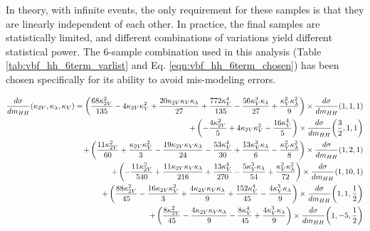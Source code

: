     In theory, with infinite events, the only requirement for these samples is that they are linearly independent of each other.
    In practice, the final samples are statistically limited, and different combinations of variations yield different statistical power.
    The 6-sample combination used in this analysis (Table \ref{tab:vbf_hh_6term_varlist} and Eq. \ref{eqn:vbf_hh_6term_chosen}) has been chosen specifically for its ability to avoid mis-modeling errors.

    {\footnotesize \begin{equation}
    \label{eqn:vbf_hh_6term_chosen}
    \begin{split}
        \frac{d\sigma}{dm_{HH}}(\kappa_{2V}, \kappa_{\lambda}, \kappa_{V}) =
            \left(\frac{68 \kappa_{2V}^{2}}{135} - 4 \kappa_{2V} \kappa_{V}^{2} + \frac{20 \kappa_{2V} \kappa_{V} \kappa_{\lambda}}{27} + \frac{772 \kappa_{V}^{4}}{135} - \frac{56 \kappa_{V}^{3} \kappa_{\lambda}}{27} + \frac{\kappa_{V}^{2} \kappa_{\lambda}^{2}}{9}\right) \times \frac{d\sigma}{dm_{HH}}{\left(1,1,1 \right)} \\
            + \left(- \frac{4 \kappa_{2V}^{2}}{5} + 4 \kappa_{2V} \kappa_{V}^{2} - \frac{16 \kappa_{V}^{4}}{5}\right) \times \frac{d\sigma}{dm_{HH}}{\left(\frac{3}{2},1,1 \right)} \\
            + \left(\frac{11 \kappa_{2V}^{2}}{60} + \frac{\kappa_{2V} \kappa_{V}^{2}}{3} - \frac{19 \kappa_{2V} \kappa_{V} \kappa_{\lambda}}{24} - \frac{53 \kappa_{V}^{4}}{30} + \frac{13 \kappa_{V}^{3} \kappa_{\lambda}}{6} - \frac{\kappa_{V}^{2} \kappa_{\lambda}^{2}}{8}\right) \times \frac{d\sigma}{dm_{HH}}{\left(1,2,1 \right)} \\
            + \left(- \frac{11 \kappa_{2V}^{2}}{540} + \frac{11 \kappa_{2V} \kappa_{V} \kappa_{\lambda}}{216} + \frac{13 \kappa_{V}^{4}}{270} - \frac{5 \kappa_{V}^{3} \kappa_{\lambda}}{54} + \frac{\kappa_{V}^{2} \kappa_{\lambda}^{2}}{72}\right) \times \frac{d\sigma}{dm_{HH}}{\left(1,10,1 \right)}  \\
            + \left(\frac{88 \kappa_{2V}^{2}}{45} - \frac{16 \kappa_{2V} \kappa_{V}^{2}}{3} + \frac{4 \kappa_{2V} \kappa_{V} \kappa_{\lambda}}{9} + \frac{152 \kappa_{V}^{4}}{45} - \frac{4 \kappa_{V}^{3} \kappa_{\lambda}}{9}\right) \times \frac{d\sigma}{dm_{HH}}{\left(1,1,\frac{1}{2} \right)} \\
            + \left(\frac{8 \kappa_{2V}^{2}}{45} - \frac{4 \kappa_{2V} \kappa_{V} \kappa_{\lambda}}{9} - \frac{8 \kappa_{V}^{4}}{45} + \frac{4 \kappa_{V}^{3} \kappa_{\lambda}}{9}\right) \times \frac{d\sigma}{dm_{HH}}{\left(1,-5,\frac{1}{2} \right)}
    \end{split}
    \end{equation}}

